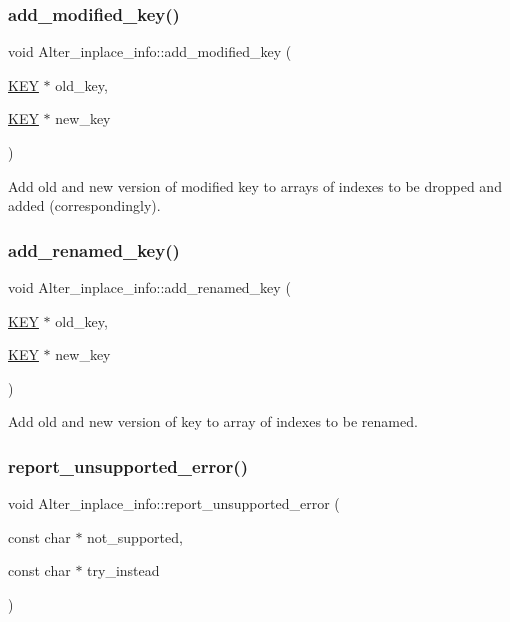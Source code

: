\subsubsection{\texorpdfstring{add\+\_\+modified\+\_\+key()}{add\_modified\_key()}}
{\footnotesize\ttfamily void Alter\+\_\+inplace\+\_\+info\+::add\+\_\+modified\+\_\+key (\begin{DoxyParamCaption}\item[{\mbox{\hyperlink{structst__key}{K\+EY}} $\ast$}]{old\+\_\+key,  }\item[{\mbox{\hyperlink{structst__key}{K\+EY}} $\ast$}]{new\+\_\+key }\end{DoxyParamCaption})\hspace{0.3cm}{\ttfamily [inline]}}

Add old and new version of modified key to arrays of indexes to be dropped and added (correspondingly). \mbox{\label{classAlter__inplace__info_a7dfe0287b43d7e00273e9dc53e495b2b}} 
\subsubsection{\texorpdfstring{add\+\_\+renamed\+\_\+key()}{add\_renamed\_key()}}
{\footnotesize\ttfamily void Alter\+\_\+inplace\+\_\+info\+::add\+\_\+renamed\+\_\+key (\begin{DoxyParamCaption}\item[{\mbox{\hyperlink{structst__key}{K\+EY}} $\ast$}]{old\+\_\+key,  }\item[{\mbox{\hyperlink{structst__key}{K\+EY}} $\ast$}]{new\+\_\+key }\end{DoxyParamCaption})\hspace{0.3cm}{\ttfamily [inline]}}

Add old and new version of key to array of indexes to be renamed. \mbox{\label{classAlter__inplace__info_a675fa8a5eedb1072620e3b831de6d946}} 
\subsubsection{\texorpdfstring{report\+\_\+unsupported\+\_\+error()}{report\_unsupported\_error()}}
{\footnotesize\ttfamily void Alter\+\_\+inplace\+\_\+info\+::report\+\_\+unsupported\+\_\+error (\begin{DoxyParamCaption}\item[{const char $\ast$}]{not\+\_\+supported,  }\item[{const char $\ast$}]{try\+\_\+instead }\end{DoxyParamCaption})}

